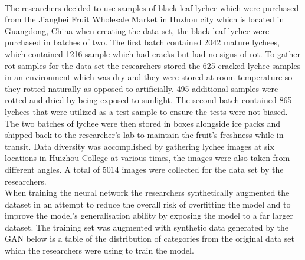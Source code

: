 \\
The researchers decided to use samples of black leaf lychee which were purchased from the Jiangbei Fruit Wholesale Market in Huzhou city which is located in Guangdong, China when creating the data set, the black leaf lychee were purchased in batches of two.  The first batch contained 2042 mature lychees, which contained 1216 sample which had cracks but had no signs of rot.  To gather rot samples for the data set the researchers stored the 625 cracked lychee samples in an environment which was dry and they were stored at room-temperature so they rotted naturally as opposed to artificially.  495 additional samples were rotted and dried by being exposed to sunlight.  The second batch contained 865 lychees that were utilized as a test sample to ensure the tests were not biased.  The two batches of lychee were then stored in boxes alongside ice packs and shipped back to the researcher's lab to maintain the fruit's freshness while in transit.  Data diversity was accomplished by gathering lychee images at six locations in Huizhou College at various times, the images were also taken from different angles.  A total of 5014 images were collected for the data set by the researchers.
\\
When training the neural network the researchers synthetically augmented the dataset in an attempt to reduce the overall risk of overfitting the model and to improve the model's generalisation ability by exposing the model to a far larger dataset.  The training set was augmented with synthetic data generated by the GAN below is a table of the distribution of categories from the original data set which the researchers were using to train the model.
\begin{table}[H]
    \centering
    \caption{Comparison of distribution of data augmented vs original(lychee Surface Defect Detection Based on Deep Convolutional
Neural Networks with GAN-Based Data Augmentation)\cite{litReviewLychee}}
    \label{tab:Comparison of distribution of data augmented vs original(lychee Surface Defect Detection Based on Deep Convolutional Neural Networks with GAN-Based Data Augmentation)}
\end{table}
